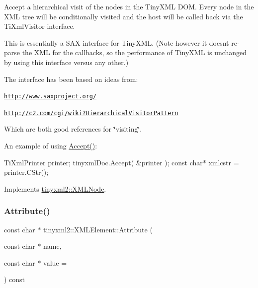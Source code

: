 Accept a hierarchical visit of the nodes in the Tiny\+X\+ML D\+OM. Every node in the X\+ML tree will be conditionally visited and the host will be called back via the Ti\+Xml\+Visitor interface.

This is essentially a S\+AX interface for Tiny\+X\+ML. (Note however it doesn\textquotesingle{}t re-\/parse the X\+ML for the callbacks, so the performance of Tiny\+X\+ML is unchanged by using this interface versus any other.)

The interface has been based on ideas from\+:


\begin{DoxyItemize}
\item \href{http://www.saxproject.org/}{\tt http\+://www.\+saxproject.\+org/}
\item \href{http://c2.com/cgi/wiki?HierarchicalVisitorPattern}{\tt http\+://c2.\+com/cgi/wiki?\+Hierarchical\+Visitor\+Pattern}
\end{DoxyItemize}

Which are both good references for \char`\"{}visiting\char`\"{}.

An example of using \hyperlink{classtinyxml2_1_1XMLElement_a9b2119831e8b85827d5d3e5076788e4a}{Accept()}\+: \begin{DoxyVerb}TiXmlPrinter printer;
tinyxmlDoc.Accept( &printer );
const char* xmlcstr = printer.CStr();
\end{DoxyVerb}
 

Implements \hyperlink{classtinyxml2_1_1XMLNode_a81e66df0a44c67a7af17f3b77a152785}{tinyxml2\+::\+X\+M\+L\+Node}.

\mbox{\label{classtinyxml2_1_1XMLElement_a48cf4a315cfbac7d74cd0d5ff2c5df51}} 
\subsubsection{\texorpdfstring{Attribute()}{Attribute()}\hspace{0.1cm}{\footnotesize\ttfamily [1/2]}}
{\footnotesize\ttfamily const char $\ast$ tinyxml2\+::\+X\+M\+L\+Element\+::\+Attribute (\begin{DoxyParamCaption}\item[{const char $\ast$}]{name,  }\item[{const char $\ast$}]{value = {} }\end{DoxyParamCaption}) const}

